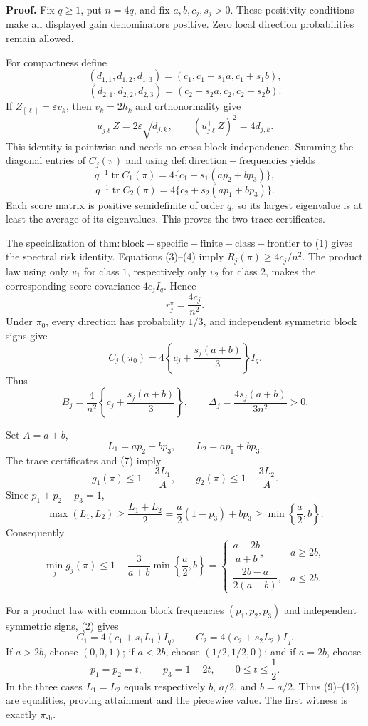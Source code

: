 \textbf{Proof.}
Fix \(q\ge1\), put \(n=4q\), and fix \(a,b,c_j,s_j>0\).  These positivity conditions make all displayed gain denominators positive.  Zero local direction probabilities remain allowed.

For compactness define
\[
(d_{1,1},d_{1,2},d_{1,3})=(c_1,c_1+s_1a,c_1+s_1b),
\]
\[
(d_{2,1},d_{2,2},d_{2,3})=(c_2+s_2a,c_2,c_2+s_2b). \tag{1}
\]
If \(Z_{[\ell]}=\varepsilon v_k\), then \(v_k=2h_k\) and orthonormality give
\[
u_{j\ell}^\top Z=2\varepsilon\sqrt{d_{j,k}},
\qquad (u_{j\ell}^\top Z)^2=4d_{j,k}. \tag{2}
\]
This identity is pointwise and needs no cross-block independence.  Summing the diagonal entries of \(C_j(\pi)\) and using \(\mathrm{def:direction-frequencies}\) yields
\[
q^{-1}\operatorname{tr}C_1(\pi)
=4\{c_1+s_1(ap_2+bp_3)\}, \tag{3}
\]
\[
q^{-1}\operatorname{tr}C_2(\pi)
=4\{c_2+s_2(ap_1+bp_3)\}. \tag{4}
\]
Each score matrix is positive semidefinite of order \(q\), so its largest eigenvalue is at least the average of its eigenvalues.  This proves the two trace certificates.

The specialization of \(\mathrm{thm:block-specific-finite-class-frontier}\) to (1) gives the spectral risk identity.  Equations (3)--(4) imply \(R_j(\pi)\ge4c_j/n^2\).  The product law using only \(v_1\) for class \(1\), respectively only \(v_2\) for class \(2\), makes the corresponding score covariance \(4c_jI_q\).  Hence
\[
r_j^\star=\frac{4c_j}{n^2}. \tag{5}
\]
Under \(\pi_0\), every direction has probability \(1/3\), and independent symmetric block signs give
\[
C_j(\pi_0)=4\left\{c_j+\frac{s_j(a+b)}3\right\}I_q. \tag{6}
\]
Thus
\[
B_j=\frac4{n^2}\left\{c_j+\frac{s_j(a+b)}3\right\},
\qquad
\Delta_j=\frac{4s_j(a+b)}{3n^2}>0. \tag{7}
\]

Set \(A=a+b\),
\[
L_1=ap_2+bp_3,
\qquad L_2=ap_1+bp_3. \tag{8}
\]
The trace certificates and (7) imply
\[
g_1(\pi)\le1-\frac{3L_1}{A},
\qquad
g_2(\pi)\le1-\frac{3L_2}{A}. \tag{9}
\]
Since \(p_1+p_2+p_3=1\),
\[
\max(L_1,L_2)
\ge\frac{L_1+L_2}{2}
=\frac a2(1-p_3)+bp_3
\ge\min\left\{\frac a2,b\right\}. \tag{10}
\]
Consequently
\[
\min_jg_j(\pi)
\le1-\frac3{a+b}\min\left\{\frac a2,b\right\}
=\begin{cases}
\dfrac{a-2b}{a+b},&a\ge2b,\\[6pt]
\dfrac{2b-a}{2(a+b)},&a\le2b.
\end{cases} \tag{11}
\]

For a product law with common block frequencies \((p_1,p_2,p_3)\) and independent symmetric signs, (2) gives
\[
C_1=4(c_1+s_1L_1)I_q,
\qquad C_2=4(c_2+s_2L_2)I_q. \tag{12}
\]
If \(a>2b\), choose \((0,0,1)\); if \(a<2b\), choose \((1/2,1/2,0)\); and if \(a=2b\), choose
\[
p_1=p_2=t,
\qquad p_3=1-2t,
\qquad 0\le t\le\frac12. \tag{13}
\]
In the three cases \(L_1=L_2\) equals respectively \(b\), \(a/2\), and \(b=a/2\).  Thus (9)--(12) are equalities, proving attainment and the piecewise value.  The first witness is exactly \(\pi_{\mathrm{sh}}\).

